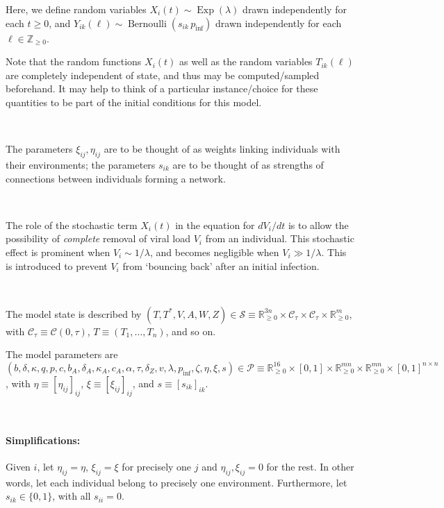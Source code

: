 \documentclass[11pt]{article}
\numberwithin{equation}{subsection}
\begin{document}
    Here, we define random variables $X_i(t) \sim
    \operatorname{Exp}(\lambda)$ drawn independently for each $t \geq 0$, and
    $Y_{ik}(\ell) \sim \operatorname{Bernoulli}(s_{ik} \, p_\text{inf})$ drawn
    independently for each $\ell \in \mathbb{Z}_{\geq 0}$.

    Note that the random functions $X_i(t)$ as well as the random variables
    $T_{ik}(\ell)$ are completely independent of state, and thus may be
    computed/sampled beforehand. It may help to think of a particular
    instance/choice for these quantities to be part of the initial conditions
    for this model.

    ~

    The parameters $\xi_{ij}, \eta_{ij}$ are to be thought of as weights
    linking individuals with their environments; the parameters $s_{ik}$ are
    to be thought of as strengths of connections between individuals forming a
    network.

    ~

    The role of the stochastic term $X_i(t)$ in the equation for $dV_i / dt$
    is to allow the possibility of \textit{complete} removal of viral load
    $V_i$ from an individual. This stochastic effect is prominent when $V_i
    \sim 1/\lambda$, and becomes negligible when $V_i \gg 1 / \lambda$.  This
    is introduced to prevent $V_i$ from `bouncing back' after an initial
    infection.

    ~

    The model state is described by $(T, T^*, V, A, W, Z) \in \mathcal{S}
    \equiv \mathbb{R}_{\geq 0}^{3n} \times \mathcal{C}_\tau \times
    \mathcal{C}_\tau \times \mathbb{R}_{\geq 0}^{m}$, with $\mathcal{C}_\tau
    \equiv \mathcal{C}(0, \tau)$, $T \equiv (T_1, \dots, T_n)$, and so on.

    The model parameters are $(b, \delta, \kappa, q, p, c, b_A, \delta_A,
    \kappa_A, c_A, \alpha, \tau, \delta_Z, v, \lambda, p_\text{inf}, \zeta,
    \eta, \xi, s) \in \mathcal{P} \equiv \mathbb{R}_{\geq 0}^{16} \times
    [0, 1] \times \mathbb{R}_{\geq 0}^{mn} \times \mathbb{R}_{\geq 0}^{mn}
    \times [0, 1]^{n\times n}$, with $\eta \equiv [\eta_{ij}]_{ij}$, $\xi
    \equiv [\xi_{ij}]_{ij}$, and $s \equiv [s_{ik}]_{ik}$.

    ~

    \paragraph{Simplifications:} Given $i$, let $\eta_{ij} = \eta$, $\xi_{ij}
    = \xi$ for precisely one $j$ and $\eta_{ij}, \xi_{ij} = 0$ for the rest.
    In other words, let each individual belong to precisely one environment.
    Furthermore, let $s_{ik} \in \{0, 1\}$, with all $s_{ii} = 0$.
\end{document}
